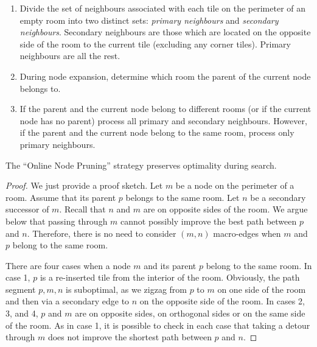 
\begin{enumerate}
\item{Divide the set of neighbours associated with each tile on the perimeter of an empty room into two distinct sets:
\emph{primary neighbours} and \emph{secondary neighbours}.
Secondary neighbours are those which are located on the opposite side of the
room to the current tile  (excluding any corner tiles).
Primary neighbours are all the rest.}
\item{During node expansion, determine which room the parent of the current node belongs to.}
\item{If the parent and the current node belong to different rooms (or if the current node has no parent) 
process all primary and secondary neighbours.
However, if the parent and the current node belong to the same room, process only primary neighbours.}
\end{enumerate}

\begin{lemma}
The ``Online Node Pruning'' strategy preserves optimality during search.
\end{lemma}
\begin{proof}
We just provide a proof sketch. 
Let $m$ be a node on the perimeter of a room. Assume that its parent $p$ belongs
to the same room.
Let $n$ be a secondary successor of $m$.
Recall that $n$ and $m$ are on opposite sides of the room.
We argue below that passing through $m$ cannot possibly improve the 
best path between $p$ and $n$.
Therefore, there is no need to consider $(m,n)$ macro-edges
when $m$ and $p$ belong to the same room.

There are four cases when a node $m$ and its parent $p$ belong to the
same room. In case 1, $p$ is a re-inserted tile from the interior of the room. 
Obviously, the path segment $p,m,n$ is suboptimal, as we zigzag from $p$ to $m$
on one side of the room and then via a secondary edge to $n$ on the opposite
side of the room.
In cases 2, 3, and 4, $p$ and $m$ are on opposite sides, on orthogonal sides or 
on the same side of the room. As in case 1, it is possible to check in each case that
taking a detour through $m$ does not improve the shortest path between $p$ and $n$.
\end{proof}

